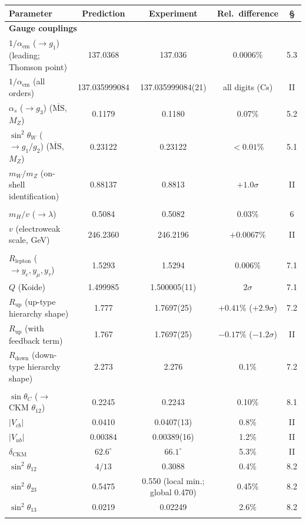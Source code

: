 \documentclass[12pt,a4paper]{article}
\begin{document}
\begin{center}\scriptsize\setlength{\tabcolsep}{3pt}
\begin{tabular}{@{}lcccc@{}}
\toprule
Parameter & Prediction & Experiment & Rel.\ difference & \S \\
\midrule
\multicolumn{5}{l}{\textbf{Gauge couplings}} \\
$1/\alpha_\mathrm{em}$ ($\to g_1$) (leading; Thomson point) & 137.0368 & 137.036 & 0.0006\% & 5.3 \\
$1/\alpha_\mathrm{em}$ (all orders) & 137.035999084 & 137.035999084(21) & all digits (Cs) & II \\
$\alpha_s$ ($\to g_3$) ($\overline{\mathrm{MS}}$, $M_Z$) & 0.1179 & 0.1180 & 0.07\% & 5.2 \\
$\sin^2\!\theta_W$ ($\to g_1/g_2$) ($\overline{\mathrm{MS}}$, $M_Z$) & 0.23122 & 0.23122 & $<0.01\%$ & 5.1 \\
$m_W/m_Z$ (on-shell identification) & 0.88137 & 0.8813 & $+1.0\sigma$ & II \\
\addlinespace
\multicolumn{5}{l}{\textbf{Higgs}} \\
$m_H/v$ ($\to\lambda$) & 0.5084 & 0.5082 & 0.03\% & 6 \\
$v$ (electroweak scale, GeV) & 246.2360 & 246.2196 & $+0.0067\%$ & II \\
\addlinespace
\multicolumn{5}{l}{\textbf{Fermion masses}} \\
$R_\mathrm{lepton}$ ($\to y_e, y_\mu, y_\tau$) & 1.5293 & 1.5294 & 0.006\% & 7.1 \\
$Q$ (Koide) & 1.499985 & 1.500005(11) & $2\sigma$ & 7.1 \\
$R_\mathrm{up}$ (up-type hierarchy shape) & 1.777 & 1.7697(25) & $+0.41\%$ ($+2.9\sigma$) & 7.2 \\
$R_\mathrm{up}$ (with feedback term) & 1.767 & 1.7697(25) & $-0.17\%$ ($-1.2\sigma$) & II \\
$R_\mathrm{down}$ (down-type hierarchy shape) & 2.273 & 2.276 & 0.1\% & 7.2 \\
\addlinespace
\multicolumn{5}{l}{\textbf{CKM / PMNS mixing}} \\
$\sin\theta_C$ ($\to$ CKM $\theta_{12}$) & 0.2245 & 0.2243 & 0.10\% & 8.1 \\
$|V_{cb}|$ & 0.0410 & 0.0407(13) & 0.8\% & II \\
$|V_{ub}|$ & 0.00384 & 0.00389(16) & 1.2\% & II \\
$\delta_\mathrm{CKM}$ & $62.6^\circ$ & $66.1^\circ$ & 5.3\% & II \\
$\sin^2\!\theta_{12}$ & $4/13$ & 0.3088 & 0.4\% & 8.2 \\
$\sin^2\!\theta_{23}$ & 0.5475 & 0.550 (local min.; global 0.470) & 0.45\% & 8.2 \\
$\sin^2\!\theta_{13}$ & 0.0219 & 0.02249 & 2.6\% & 8.2 \\
\addlinespace
\bottomrule
\end{tabular}
\end{center}
\end{document}
